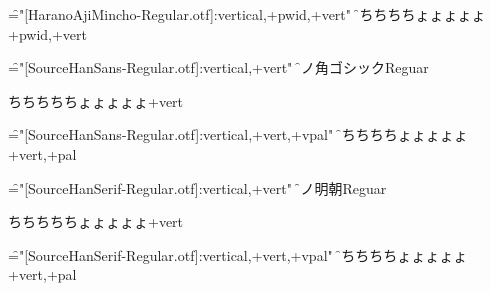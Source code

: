 \font\f="[HaranoAjiMincho-Regular.otf]:vertical,+pwid,+vert"
\f
ちちちちちょょょょょ+pwid,+vert

\font\f="[SourceHanSans-Regular.otf]:vertical,+vert"
\f
源ノ角ゴシックReguar

ちちちちちょょょょょ+vert

\font\f="[SourceHanSans-Regular.otf]:vertical,+vert,+vpal"
\f

ちちちちちょょょょょ+vert,+pal

\font\f="[SourceHanSerif-Regular.otf]:vertical,+vert"
\f
源ノ明朝Reguar

ちちちちちょょょょょ+vert

\font\f="[SourceHanSerif-Regular.otf]:vertical,+vert,+vpal"
\f

ちちちちちょょょょょ+vert,+pal

\bye
